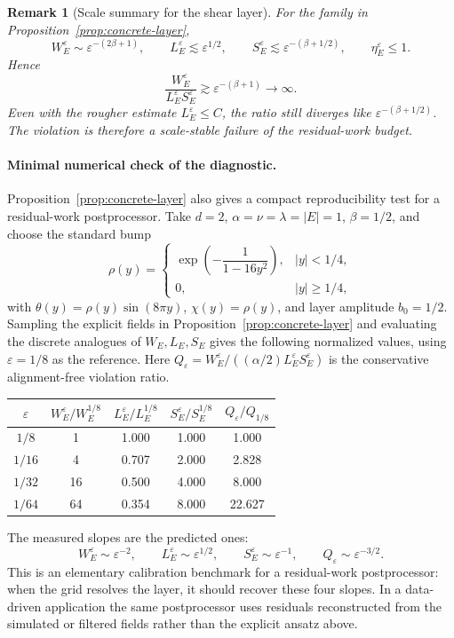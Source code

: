 \documentclass[11pt]{article}
\numberwithin{equation}{section}
\newtheorem{remark}[theorem]{Remark}
\newcommand{\eps}{\varepsilon}
\begin{document}
\begin{remark}[Scale summary for the shear layer]
For the family in Proposition~\ref{prop:concrete-layer},
\[
  W_E^\eps\sim \eps^{-(2\beta+1)},
  \qquad
  L_E^\eps\lesssim \eps^{1/2},
  \qquad
  S_E^\eps\lesssim \eps^{-(\beta+1/2)},
  \qquad
  \eta_E^\eps\le1.
\]
Hence
\[
  \frac{W_E^\eps}{L_E^\eps S_E^\eps}
  \gtrsim \eps^{-(\beta+1)}\to\infty .
\]
Even with the rougher estimate \(L_E^\eps\le C\), the ratio still diverges like
\(\eps^{-(\beta+1/2)}\).  The violation is therefore a scale-stable failure of
the residual-work budget.

\end{remark}

\paragraph{Minimal numerical check of the diagnostic.}
Proposition~\ref{prop:concrete-layer} also gives a compact reproducibility test
for a residual-work postprocessor.  Take
\(d=2\), \(\alpha=\nu=\lambda=|E|=1\), \(\beta=1/2\), and choose the standard
bump
\[
  \rho(y)=
  \begin{cases}
  \exp\!\left(-\dfrac{1}{1-16y^2}\right),& |y|<1/4,\\
  0,& |y|\ge1/4,
  \end{cases}
\]
with \(\theta(y)=\rho(y)\sin(8\pi y)\), \(\chi(y)=\rho(y)\), and layer
amplitude \(b_0=1/2\).  Sampling the explicit fields in
Proposition~\ref{prop:concrete-layer} and evaluating the discrete analogues of
\(W_E,L_E,S_E\) gives the following normalized values, using
\(\varepsilon=1/8\) as the reference.  Here
\(Q_\varepsilon=W_E^\varepsilon/((\alpha/2)L_E^\varepsilon S_E^\varepsilon)\)
is the conservative alignment-free violation ratio.

\begin{center}
\small
\begin{tabular}{c|c|c|c|c}
\hline
\(\varepsilon\) & \(W_E^\varepsilon/W_E^{1/8}\) &
\(L_E^\varepsilon/L_E^{1/8}\) &
\(S_E^\varepsilon/S_E^{1/8}\) &
\(Q_\varepsilon/Q_{1/8}\) \\
\hline
\(1/8\)  & 1  & 1.000 & 1.000 & 1.000 \\
\(1/16\) & 4  & 0.707 & 2.000 & 2.828 \\
\(1/32\) & 16 & 0.500 & 4.000 & 8.000 \\
\(1/64\) & 64 & 0.354 & 8.000 & 22.627 \\
\hline
\end{tabular}
\end{center}
The measured slopes are the predicted ones:
\[
  W_E^\varepsilon\sim\varepsilon^{-2},\qquad
  L_E^\varepsilon\sim\varepsilon^{1/2},\qquad
  S_E^\varepsilon\sim\varepsilon^{-1},\qquad
  Q_\varepsilon\sim\varepsilon^{-3/2}.
\]
This is an elementary calibration benchmark for a residual-work postprocessor:
when the grid resolves the layer, it should recover these four slopes.  In a
data-driven application the same postprocessor uses residuals reconstructed
from the simulated or filtered fields rather than the explicit ansatz above.
\end{document}
